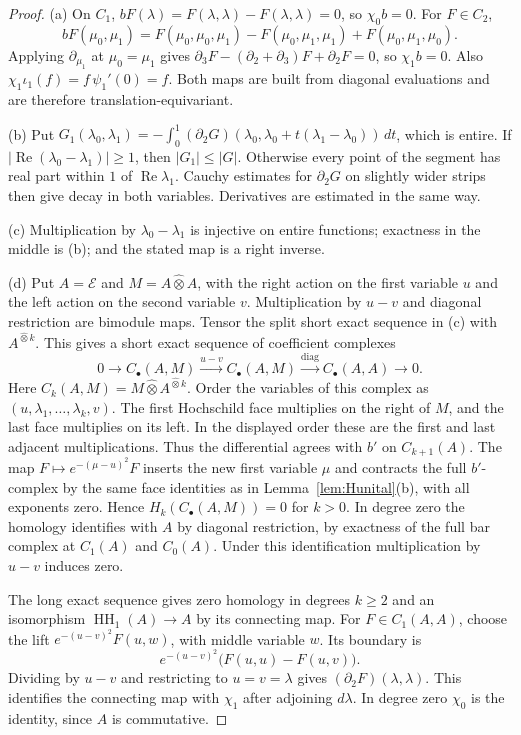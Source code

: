 \documentclass[11pt,oneside,reqno]{article}
\DeclareMathOperator{\HH}{HH}
\newcommand{\cE}{\mathcal E}
\theoremstyle{plain}
\theoremstyle{definition}
\theoremstyle{remark}
\begin{document}
\begin{proof}
(a) On \(C_1\), \(bF(\lambda)=F(\lambda,\lambda)-F(\lambda,\lambda)=0\), so
\(\chi_0b=0\). For \(F\in C_2\),
\[
 bF(\mu_0,\mu_1)=F(\mu_0,\mu_0,\mu_1)-F(\mu_0,\mu_1,\mu_1)+
 F(\mu_0,\mu_1,\mu_0).
\]
Applying \(\partial_{\mu_1}\) at \(\mu_0=\mu_1\)
gives \(\partial_3F-(\partial_2+\partial_3)F+\partial_2F=0\), so
\(\chi_1b=0\). Also \(\chi_1\iota_1(f)=f\,\psi_1'(0)=f\). Both maps are
built from diagonal evaluations and are therefore translation-equivariant.

(b) Put \(G_1(\lambda_0,\lambda_1)=-\int_0^1(\partial_2G)(\lambda_0,
\lambda_0+t(\lambda_1-\lambda_0))\,dt\), which is entire. If
\(|\operatorname{Re}(\lambda_0-\lambda_1)|\geq1\), then \(|G_1|\leq|G|\).
Otherwise every point of the segment has real part within \(1\) of
\(\operatorname{Re}\lambda_1\). Cauchy estimates for \(\partial_2G\) on
slightly wider strips then give decay in both variables. Derivatives are
estimated in the same way.

(c) Multiplication by \(\lambda_0-\lambda_1\) is injective on entire
functions; exactness in the middle is (b); and the stated map is a right
inverse.

(d) Put \(A=\cE\) and \(M=A\widehat\otimes A\), with the right
action on the first variable \(u\) and the left action on the second
variable \(v\). Multiplication by \(u-v\) and diagonal restriction are
bimodule maps. Tensor the split short exact sequence in (c) with
\(A^{\widehat\otimes k}\). This gives a short exact sequence of
coefficient complexes
\[
 0\longrightarrow C_\bullet(A,M)\xrightarrow{u-v}C_\bullet(A,M)
 \xrightarrow{\mathrm{diag}} C_\bullet(A,A)\longrightarrow 0 .
\]
Here \(C_k(A,M)=M\widehat\otimes A^{\widehat\otimes k}\).
Order the variables of this complex as
\((u,\lambda_1,\ldots,\lambda_k,v)\). The first Hochschild face
multiplies on the right of \(M\), and the last face multiplies on its
left. In the displayed order these are the first and last adjacent
multiplications. Thus the differential agrees with \(b'\) on
\(C_{k+1}(A)\). The map \(F\mapsto e^{-(\mu-u)^2}F\) inserts the new
first variable \(\mu\) and contracts the full \(b'\)-complex by the
same face identities as in Lemma~\ref{lem:Hunital}(b), with all
exponents zero. Hence \(H_k(C_\bullet(A,M))=0\) for \(k>0\).
In degree zero the homology identifies with \(A\) by diagonal
restriction, by exactness of the full bar complex at \(C_1(A)\) and
\(C_0(A)\). Under this identification multiplication by \(u-v\)
induces zero.

The long exact sequence gives zero homology in degrees \(k\geq2\)
and an isomorphism \(\HH_1(A)\to A\) by its connecting map.
For \(F\in C_1(A,A)\), choose the lift
\(e^{-(u-v)^2}F(u,w)\), with middle variable \(w\). Its boundary is
\[
 e^{-(u-v)^2}\bigl(F(u,u)-F(u,v)\bigr).
\]
Dividing by \(u-v\) and restricting to \(u=v=\lambda\) gives
\((\partial_2F)(\lambda,\lambda)\). This identifies the connecting
map with \(\chi_1\) after adjoining \(d\lambda\). In degree zero
\(\chi_0\) is the identity, since \(A\) is commutative.
\end{proof}
\end{document}
